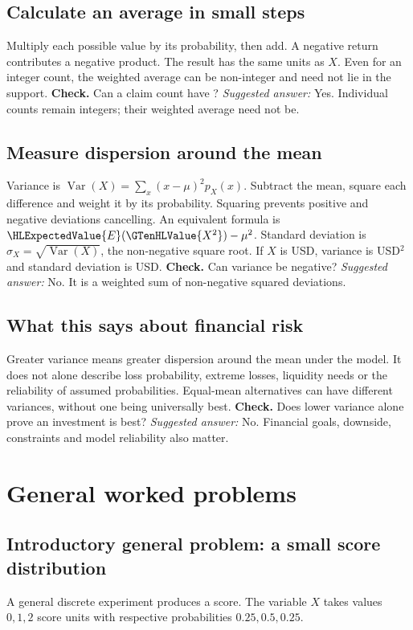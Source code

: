 \subsection{Calculate an average in small steps}
Multiply each possible value by its probability, then add. A negative return contributes a negative product. The result has the same units as $X$. Even for an integer count, the weighted average can be non-integer and need not lie in the support.
\textbf{Check.} Can a claim count have  ? \emph{Suggested answer:} Yes. Individual counts remain integers; their weighted average need not be.


\subsection{Measure dispersion around the mean}
Variance is $\operatorname{Var}(X)=\sum_x(x-\mu)^2p_X(x)$. Subtract the mean, square each difference and weight it by its probability. Squaring prevents positive and negative deviations cancelling. An equivalent formula is $\HLExpectedValue{E}(\GTenHLValue{X^2})-\mu^2$. Standard deviation is $\sigma_X=\sqrt{\operatorname{Var}(X)}$, the non-negative square root. If $X$ is USD, variance is USD$^2$ and standard deviation is USD.
\textbf{Check.} Can variance be negative? \emph{Suggested answer:} No. It is a weighted sum of non-negative squared deviations.


\subsection{What this says about financial risk}
Greater variance means greater dispersion around the mean under the model. It does not alone describe loss probability, extreme losses, liquidity needs or the reliability of assumed probabilities. Equal-mean alternatives can have different variances, without one being universally best.
\textbf{Check.} Does lower variance alone prove an investment is best? \emph{Suggested answer:} No. Financial goals, downside, constraints and model reliability also matter.

\section{General worked problems}
\subsection{Introductory general problem: a small score distribution}\label{ex:c8-score}
A general discrete experiment produces a score. The variable $X$ takes values $ 0, 1, 2$ score units with respective probabilities $ 0.25, 0.5, 0.25$.

